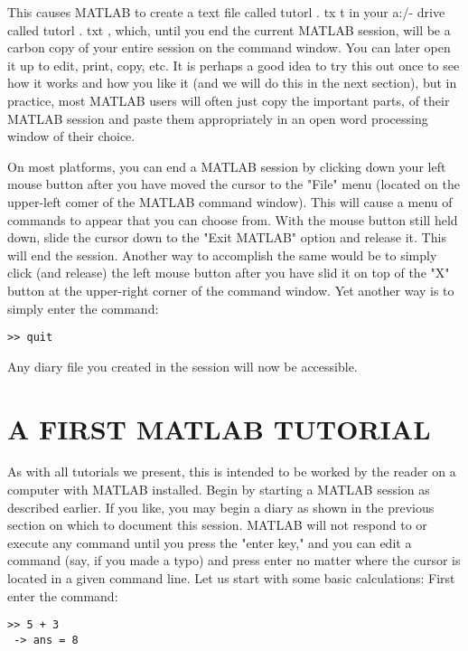 \documentclass[../main.tex]{subfiles}
\begin{document}
This causes MATLAB to create a text file called tutorl . tx t in your a:/- drive
called tutorl . txt , which, until you end the current MATLAB session, will be
a carbon copy of your entire session on the command window. You can later
open it up to edit, print, copy, etc. It is perhaps a good idea to try this out once to
see how it works and how you like it (and we will do this in the next section), but
in practice, most MATLAB users will often just copy the important parts, of their
MATLAB session and paste them appropriately in an open word processing
window of their choice.


On most platforms, you can end a MATLAB session by clicking down your left
mouse button after you have moved the cursor to the "File" menu (located on the
upper-left comer of the MATLAB command window). This will cause a menu of
commands to appear that you can choose from. With the mouse button still held
down, slide the cursor down to the "Exit MATLAB" option and release it. This will end the session. Another way to accomplish the same would be to simply
click (and release) the left mouse button after you have slid it on top of the "X"
button at the upper-right corner of the command window. Yet another way is to
simply enter the command: 

\begin{verbatim}
>> quit 
\end{verbatim}

\noindent Any diary file you created in the session will now be accessible.

\section{A FIRST MATLAB TUTORIAL}

\noindent As with all tutorials we present, this is intended to be worked by the reader on a
computer with MATLAB installed. Begin by starting a MATLAB session as
described earlier. If you like, you may begin a diary as shown in the previous
section on which to document this session. MATLAB will not respond to or
execute any command until you press the "enter key," and you can edit a
command (say, if you made a typo) and press enter no matter where the cursor is
located in a given command line. Let us start with some basic calculations: First
enter the command:

\begin{verbatim}
>> 5 + 3
 -> ans = 8
\end{verbatim}
\end{document}
